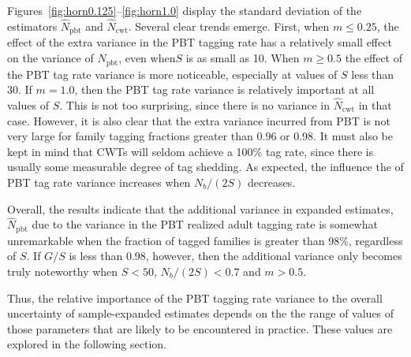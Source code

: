 \documentclass[11pt]{article}
\begin{document}
Figures~\ref{fig:horn0.125}--\ref{fig:horn1.0} display the standard deviation of the estimators
$\hat{N}_\mathrm{pbt}$ and $\hat{N}_\mathrm{cwt}$.  Several clear trends emerge.  First, when 
$m\leq 0.25$, the effect of the extra  variance in the PBT tagging rate has a relatively small
effect on the variance of $\hat{N}_\mathrm{pbt}$, even when$S$ is as small as 10.  When $m\geq 0.5$
the effect of the PBT tag rate variance is more noticeable, especially at values of $S$ less than
30.  If $m=1.0$, then the PBT tag rate variance is relatively important at all values of
$S$.  This is not too surprising, since there is no variance in $\hat{N}_\mathrm{cwt}$ in that
case.  However, it is also clear that the extra variance incurred from PBT is not very large
for family tagging fractions greater than 0.96 or 0.98.  It must also be kept in mind that
CWTs will seldom achieve a 100\% tag rate, since there is usually some measurable degree of
tag shedding.   As expected, the influence the of PBT tag rate variance increases when $N_b/(2S)$
decreases.

Overall, the results indicate that the additional variance in expanded estimates,
$\hat{N}_\mathrm{pbt}$ due to the variance in the PBT realized adult tagging rate is somewhat unremarkable 
when the fraction of tagged families is greater than 98\%, regardless of $S$.  If 
$G/S$ is less than 0.98, however, then the additional variance only becomes truly 
noteworthy when $S<50$, $N_b/(2S) < 0.7$ and $m > 0.5$.

Thus, the relative importance of the PBT tagging rate variance to the overall uncertainty of 
sample-expanded estimates depends on the the range of values of those parameters that are
likely to be encountered in practice.  These values are explored in the following section.
\end{document}
